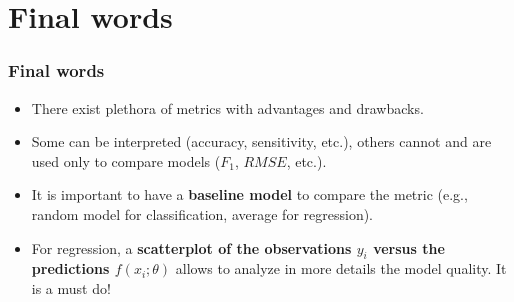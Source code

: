 \section{Final words}
\begin{frame}
\frametitle{Final words}
\begin{itemize}
\item There exist plethora of metrics with advantages and drawbacks. 
\item Some can be interpreted (accuracy, sensitivity, etc.), others cannot and are used only to compare models ($F_1$, $RMSE$, etc.).
\item It is important to have a {\bf baseline model} to compare the metric (e.g., random model for classification, average for regression).
\item For regression, a {\bf scatterplot of the observations $y_i$ versus the predictions $f(x_i;\theta)$} allows to analyze in more details the model quality. It is a must do!
\end{itemize}
\end{frame}





